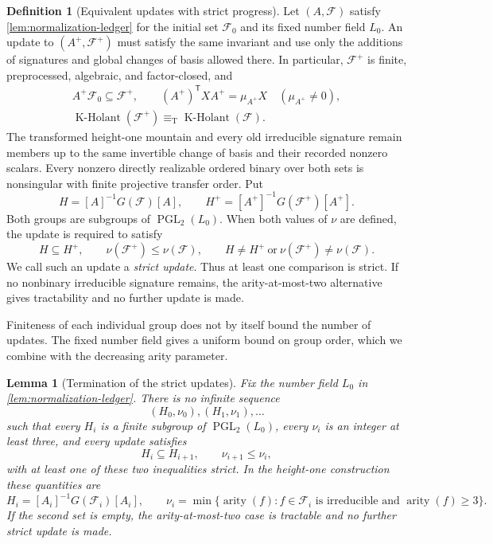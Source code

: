 \documentclass[11pt,letterpaper,onecolumn]{article}
\theoremstyle{plain}
\newtheorem{lemma}[lemma]{Lemma}
\theoremstyle{definition}
\newtheorem{definition}[definition]{Definition}
\theoremstyle{remark}
\newcommand{\cF}{\mathcal F}
\newcommand{\KHolant}{\operatorname{K\text{-}Holant}}
\newcommand{\PGL}{\operatorname{PGL}}
\newcommand{\arity}{\operatorname{arity}}
\newcommand{\equivT}{\equiv_{\mathrm T}}
\begin{document}
	\begin{definition}[Equivalent updates with strict progress]
		\label{def:height-one-outer-successor}
		Let \((A,\cF)\) satisfy \cref{lem:normalization-ledger} for the initial
		set \(\cF_0\) and its fixed number field \(L_0\).  An update to
		\((A^+,\cF^+)\) must satisfy the same invariant and use only the
		additions of signatures and global changes of basis allowed there.  In particular,
		\(\cF^+\) is finite, preprocessed, algebraic, and factor-closed, and
		\[
		\begin{gathered}
			A^+\cF_0\subseteq\cF^+,
			\qquad (A^+)^{\mathsf T}XA^+=\mu_{A^+}X\quad(\mu_{A^+}\ne0),\\
			\KHolant(\cF^+)\equivT\KHolant(\cF).
		\end{gathered}
		\]
		The transformed height-one mountain and every old irreducible signature
		remain members up to the same invertible change of basis and their recorded
		nonzero scalars.  Every nonzero directly realizable ordered binary over
		both sets is nonsingular with finite projective transfer order.  Put
		\[
		H=[A]^{-1}G(\cF)[A],
		\qquad H^+=[A^+]^{-1}G(\cF^+)[A^+].
		\]
		Both groups are subgroups of \(\PGL_2(L_0)\).  When both values of \(\nu\)
		are defined, the update is required to satisfy
		\[
		H\subseteq H^+,
		\qquad \nu(\cF^+)\le\nu(\cF),
		\qquad
		H\ne H^+\ \text{or}\ \nu(\cF^+)\ne\nu(\cF).
		\]
		We call such an update a \emph{strict update}. Thus at least one comparison is strict.  If no nonbinary irreducible
		signature remains, the arity-at-most-two alternative gives tractability
		and no further update is made.
	\end{definition}
	
	Finiteness of each individual group does not by itself bound the number
	of updates. The fixed number field gives a uniform bound on group order,
	which we combine with the decreasing arity parameter.

	\begin{lemma}[Termination of the strict updates]
		\label{lem:height-one-progress-well-founded}
		Fix the number field \(L_0\) in
		\cref{lem:normalization-ledger}.  There is no infinite sequence
		\[
		(H_0,\nu_0),(H_1,\nu_1),\ldots
		\]
		such that every \(H_i\) is a finite subgroup of \(\PGL_2(L_0)\), every
		\(\nu_i\) is an integer at least three, and every update satisfies
		\[
		H_i\subseteq H_{i+1},
		\qquad
		\nu_{i+1}\le\nu_i,
		\]
		with at least one of these two inequalities strict.  In the height-one
		construction these quantities are
		\[
		H_i=[A_i]^{-1}G(\cF_i)[A_i],
		\qquad
		\nu_i=\min\{\arity(f):f\in\cF_i
		\text{ is irreducible and }\arity(f)\ge3\}.
		\]
        If the second set is empty, the arity-at-most-two case is tractable and no
        further strict update is made.
	\end{lemma}
	
\end{document}
